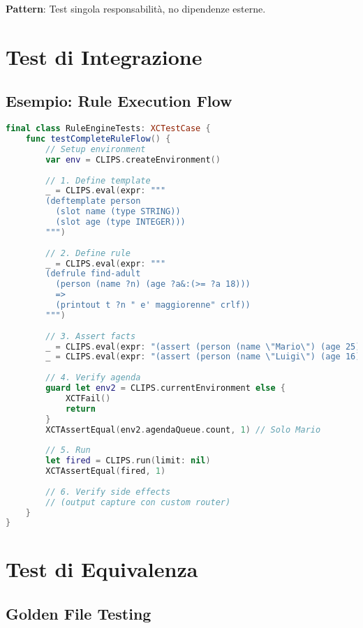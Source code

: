 \textbf{Pattern}: Test singola responsabilità, no dipendenze esterne.

\section{Test di Integrazione}

\subsection{Esempio: Rule Execution Flow}

\begin{lstlisting}[language=Swift]
final class RuleEngineTests: XCTestCase {
    func testCompleteRuleFlow() {
        // Setup environment
        var env = CLIPS.createEnvironment()
        
        // 1. Define template
        _ = CLIPS.eval(expr: """
        (deftemplate person
          (slot name (type STRING))
          (slot age (type INTEGER)))
        """)
        
        // 2. Define rule
        _ = CLIPS.eval(expr: """
        (defrule find-adult
          (person (name ?n) (age ?a&:(>= ?a 18)))
          =>
          (printout t ?n " e' maggiorenne" crlf))
        """)
        
        // 3. Assert facts
        _ = CLIPS.eval(expr: "(assert (person (name \"Mario\") (age 25)))")
        _ = CLIPS.eval(expr: "(assert (person (name \"Luigi\") (age 16)))")
        
        // 4. Verify agenda
        guard let env2 = CLIPS.currentEnvironment else {
            XCTFail()
            return
        }
        XCTAssertEqual(env2.agendaQueue.count, 1) // Solo Mario
        
        // 5. Run
        let fired = CLIPS.run(limit: nil)
        XCTAssertEqual(fired, 1)
        
        // 6. Verify side effects
        // (output capture con custom router)
    }
}
\end{lstlisting}

\section{Test di Equivalenza}

\subsection{Golden File Testing}

